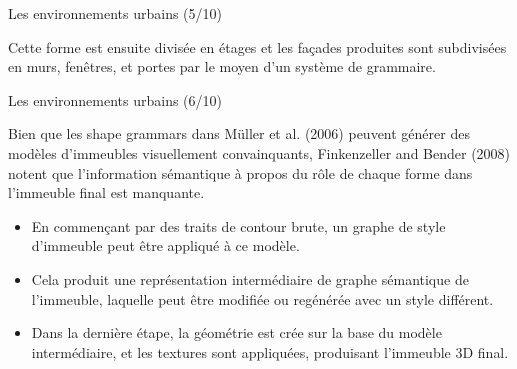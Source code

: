 \documentclass{beamer}
\begin{document}
\begin{frame}{Les environnements urbains (5/10)}


Cette forme est ensuite divisée en étages et les façades produites sont subdivisées en murs, fenêtres, et portes par le moyen d'un système de grammaire. \newline

\newline

\newline

\end{frame}

\begin{frame}{Les environnements urbains (6/10)}

Bien que les shape grammars dans Müller et al. (2006) peuvent générer des modèles d'immeubles visuellement convainquants, Finkenzeller and Bender (2008) notent que l'information sémantique à propos du rôle de chaque forme dans l'immeuble final est manquante.\newline


\begin{itemize}
\item<3-> En commençant par des traits de contour brute, un graphe de style d'immeuble peut être appliqué à ce modèle.
\item<4-> Cela produit une représentation intermédiaire de graphe sémantique de l'immeuble, laquelle peut être modifiée ou regénérée avec un style différent.
\item<5-> Dans la dernière étape, la géométrie est crée sur la base du modèle intermédiaire, et les textures sont appliquées, produisant l'immeuble 3D final.
\end{itemize}
 
\end{frame}
\end{document}
